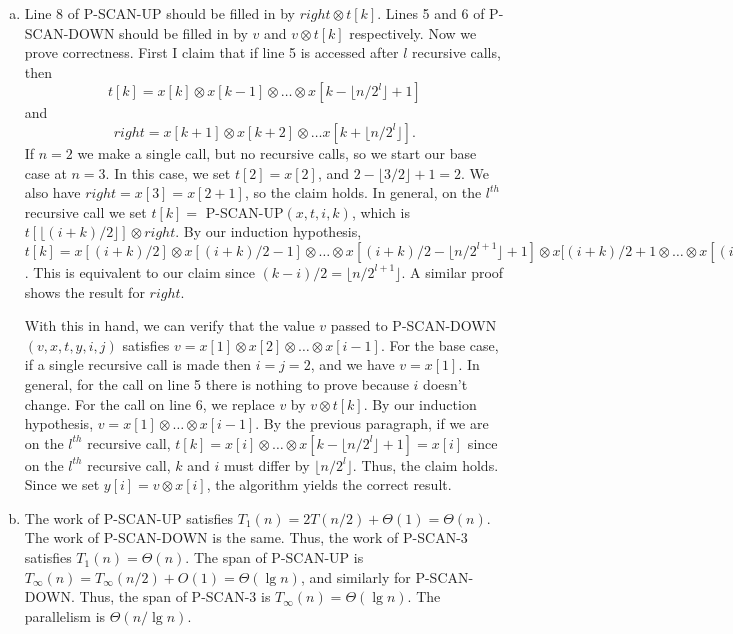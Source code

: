 \documentclass{article}
\begin{document}
\begin{enumerate}[a.]
\item Line 8 of P-SCAN-UP should be filled in by $right \otimes t[k]$.  Lines 5 and 6 of P-SCAN-DOWN should be filled in by $v$ and $v \otimes t[k]$ respectively.  Now we prove correctness.  First I claim that if line 5 is accessed after $l$ recursive calls, then 
\[t[k] = x[k] \otimes x[k-1] \otimes \ldots \otimes x[k-\lfloor n/2^l\rfloor + 1]\]
 and 
\[right = x[k+1] \otimes x[k+2] \otimes \ldots x[k+ \lfloor n/2^l \rfloor ].\]
If $n=2$ we make a single call, but no recursive calls, so we start our base case at $n=3$.  In this case, we set $t[2] = x[2]$, and $2-\lfloor3/2\rfloor+1 = 2$.  We also have $right = x[3] = x[2+1]$, so the claim holds.  In general, on the $l^{th}$ recursive call we set $t[k] = $ P-SCAN-UP$(x,t,i,k)$, which is $t[\lfloor (i+k)/2 \rfloor] \otimes right$. By our induction hypothesis, $t[k] = x[(i+k)/2] \otimes x[(i+k)/2 - 1] \otimes \ldots \otimes x[(i+k)/2 - \lfloor n/2^{l+1}\rfloor + 1] \otimes x[(i+k)/2 + 1 \otimes \ldots \otimes x[(i+k)/2 +   \lfloor n/2^{l+1}\rfloor]$.  This is equivalent to our claim since $(k-i)/2 =  \lfloor n/2^{l+1}\rfloor$. A similar proof shows the result for $right$.  

With this in hand, we can verify that the value $v$ passed to P-SCAN-DOWN$(v,x,t,y,i,j)$ satisfies $v = x[1] \otimes x[2] \otimes \ldots \otimes x[i-1]$.  For the base case, if a single recursive call is made then $i = j = 2$, and we have $v = x[1]$.  In general, for the call on line 5 there is nothing to prove because $i$ doesn't change.  For the call on line 6, we replace $v$ by $v \otimes t[k]$.  By our induction hypothesis, $v = x[1] \otimes \ldots \otimes x[i-1]$.  By the previous paragraph, if we are on the $l^{th}$ recursive call, $t[k] = x[i] \otimes \ldots \otimes x[k - \lfloor n/2^{l} \rfloor + 1] = x[i]$ since on the $l^{th}$ recursive call, $k$ and $i$ must differ by $\lfloor n/2^{l} \rfloor$. Thus, the claim holds.  Since we set $y[i] = v\otimes x[i]$, the algorithm yields the correct result. \\

\item The work of P-SCAN-UP satisfies $T_1(n) = 2T(n/2) + \Theta(1) = \Theta(n)$.  The work of P-SCAN-DOWN is the same.  Thus, the work of P-SCAN-3 satisfies $T_1(n) = \Theta(n)$. The span of P-SCAN-UP is $T_\infty(n) = T_\infty(n/2) + O(1) = \Theta(\lg n)$, and similarly for P-SCAN-DOWN.  Thus, the span of P-SCAN-3 is $T_\infty(n) = \Theta(\lg n)$.  The parallelism is $\Theta(n/\lg n)$. \\
\end{enumerate}
\end{document}
